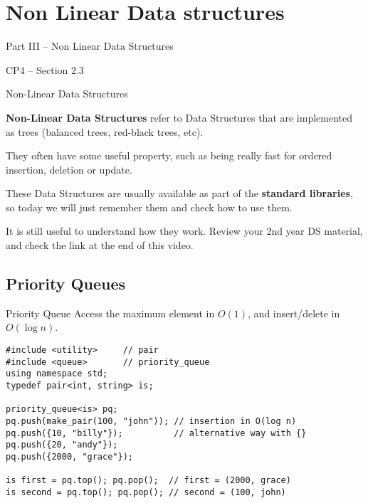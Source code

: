 \section{Non Linear Data structures}
\begin{frame}
  \begin{center}
    {\large Part III -- Non Linear Data Structures

    CP4 -- Section 2.3
    }
  \end{center}
\end{frame}

\begin{frame}{Non-Linear Data Structures}

  {\bf Non-Linear Data Structures} refer to Data Structures that are implemented as trees (balanced trees, red-black trees, etc).\bigskip

  They often have some useful property, such as being really fast for ordered insertion, deletion or update.\bigskip

  These Data Structures are usually available as part of the {\bf standard libraries}, so today we will just remember them and check how to use them.\bigskip

  \begin{block}{}
    It is still useful to understand how they work. Review your 2nd year DS material, and check the link at the end of this video.
  \end{block}
\end{frame}

\subsection{Priority Queues}

\begin{frame}[fragile]{Priority Queue}
Access the maximum element in $O(1)$, and insert/delete in $O(\log n)$.

\begin{verbatim}
#include <utility>     // pair
#include <queue>       // priority_queue
using namespace std;
typedef pair<int, string> is;

priority_queue<is> pq;
pq.push(make_pair(100, "john")); // insertion in O(log n)
pq.push({10, "billy"});          // alternative way with {}
pq.push({20, "andy"});
pq.push({2000, "grace"});

is first = pq.top(); pq.pop();  // first = (2000, grace)
is second = pq.top(); pq.pop(); // second = (100, john)
\end{verbatim}
\end{frame}

